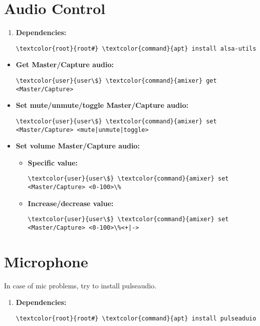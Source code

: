 \documentclass[10pt, a4paper, onecolumn, openany]{book} %
\begin{document}
\section{Audio Control}
\begin{enumerate}
    \item \textbf{Dependencies:}
\begin{Verbatim}[commandchars=\\\{\}]
\textcolor{root}{root#} \textcolor{command}{apt} install alsa-utils
\end{Verbatim}
\end{enumerate}
\begin{itemize}
    \item \textbf{Get Master/Capture audio:}
\begin{Verbatim}[commandchars=\\\{\}]
\textcolor{user}{user\$} \textcolor{command}{amixer} get <Master/Capture>
\end{Verbatim}
    \item \textbf{Set mute/unmute/toggle Master/Capture audio:}
\begin{Verbatim}[commandchars=\\\{\}]
\textcolor{user}{user\$} \textcolor{command}{amixer} set <Master/Capture> <mute|unmute|toggle>
\end{Verbatim}
    \item \textbf{Set volume Master/Capture audio:}
    \begin{itemize}
        \item \textbf{Specific value:}
\begin{Verbatim}[commandchars=\\\{\}]
\textcolor{user}{user\$} \textcolor{command}{amixer} set <Master/Capture> <0-100>\%
\end{Verbatim}
        \item \textbf{Increase/decrease value:}
\begin{Verbatim}[commandchars=\\\{\}]
\textcolor{user}{user\$} \textcolor{command}{amixer} set <Master/Capture> <0-100>\%<+|->    
\end{Verbatim}
    \end{itemize}
\end{itemize}
\section{Microphone}
In case of mic problems, try to install pulseaudio.
\begin{enumerate}
    \item \textbf{Dependencies:}
\begin{Verbatim}[commandchars=\\\{\}]
\textcolor{root}{root#} \textcolor{command}{apt} install pulseaduio
\end{Verbatim}
\end{enumerate}
\end{document}
